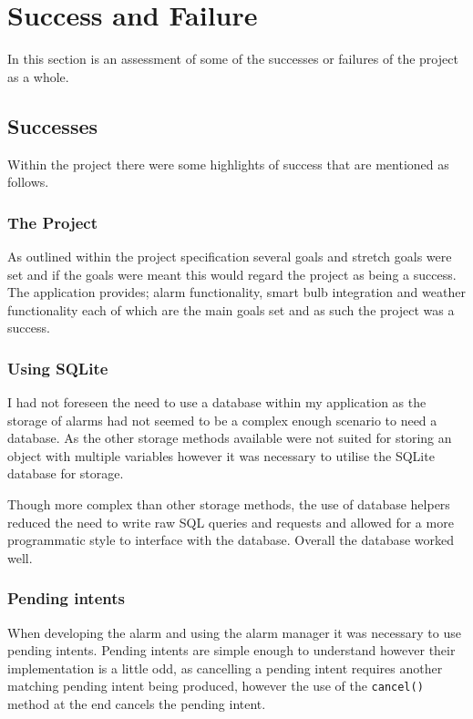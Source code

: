 \section{Success and Failure}\label{success-and-failure}

In this section is an assessment of some of the successes or failures of
the project as a whole.

\subsection{Successes}\label{successes}

Within the project there were some highlights of success that are
mentioned as follows.

\subsubsection{The Project}\label{the-project}

As outlined within the project specification several goals and stretch
goals were set and if the goals were meant this would regard the project
as being a success. The application provides; alarm functionality, smart
bulb integration and weather functionality each of which are the main
goals set and as such the project was a success.

\subsubsection{Using SQLite}\label{using-sqlite}

I had not foreseen the need to use a database within my application as
the storage of alarms had not seemed to be a complex enough scenario to
need a database. As the other storage methods available were not suited
for storing an object with multiple variables however it was necessary
to utilise the SQLite database for storage.

Though more complex than other storage methods, the use of database
helpers reduced the need to write raw SQL queries and requests and
allowed for a more programmatic style to interface with the database.
Overall the database worked well.

\subsubsection{Pending intents}\label{pending-intents}

When developing the alarm and using the alarm manager it was necessary
to use pending intents. Pending intents are simple enough to understand
however their implementation is a little odd, as cancelling a pending
intent requires another matching pending intent being produced, however
the use of the \lstinline!cancel()! method at the end cancels the
pending intent.

